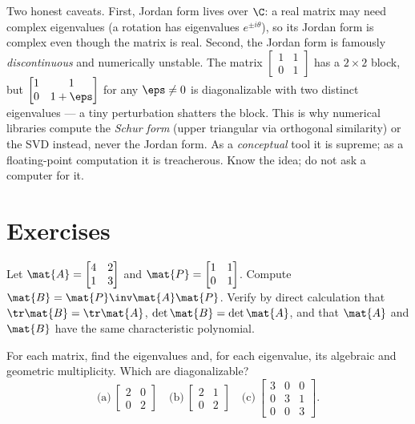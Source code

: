 \begin{remark}
\label{ch28:remark-caution}
Two honest caveats. First, Jordan form lives over $\C$: a real matrix may need complex
eigenvalues (a rotation has eigenvalues $e^{\pm i\theta}$), so its Jordan form is complex
even though the matrix is real. Second, the Jordan form is famously \emph{discontinuous}
and numerically unstable. The matrix $\begin{bmatrix}1&1\\0&1\end{bmatrix}$ has a $2\times2$
block, but $\begin{bmatrix}1&1\\0&1+\eps\end{bmatrix}$ for any $\eps\neq0$ is
diagonalizable with two distinct eigenvalues --- a tiny perturbation shatters the block.
This is why numerical libraries compute the \emph{Schur form} (upper triangular via
orthogonal similarity) or the SVD instead, never the Jordan form. As a \emph{conceptual}
tool it is supreme; as a floating-point computation it is treacherous. Know the idea; do
not ask a computer for it.
\end{remark}

\section{Exercises}
\label{ch28:exercises}

\begin{exercise}
\label{ch28:ex-invariants}
Let $\mat{A}=\begin{bmatrix}4&2\\1&3\end{bmatrix}$ and
$\mat{P}=\begin{bmatrix}1&1\\0&1\end{bmatrix}$. Compute $\mat{B}=\mat{P}\inv\mat{A}\mat{P}$.
Verify by direct calculation that $\tr\mat{B}=\tr\mat{A}$, $\det\mat{B}=\det\mat{A}$, and
that $\mat{A}$ and $\mat{B}$ have the same characteristic polynomial.
\end{exercise}

\begin{exercise}
\label{ch28:ex-mult}
For each matrix, find the eigenvalues and, for each eigenvalue, its algebraic and
geometric multiplicity. Which are diagonalizable?
\[
\text{(a)}\ \begin{bmatrix}2&0\\0&2\end{bmatrix}\quad
\text{(b)}\ \begin{bmatrix}2&1\\0&2\end{bmatrix}\quad
\text{(c)}\ \begin{bmatrix}3&0&0\\0&3&1\\0&0&3\end{bmatrix}.
\]
\end{exercise}

